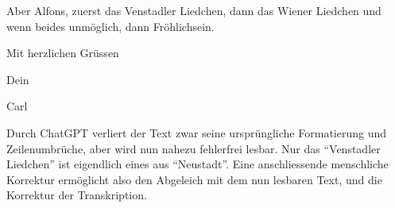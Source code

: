 \documentclass[12pt, a4paper, ngerman, bidi=default]{article}
\begin{document}
\begin{description}
\begin{tcolorbox}[colback=oldLetter, colframe=black, sharp corners, width=\textwidth]
Aber Alfons, zuerst das Venstadler Liedchen, dann das Wiener Liedchen und wenn beides unmöglich, dann Fröhlichsein.

Mit herzlichen Grüssen

Dein

Carl
\end{tcolorbox}

\label{fig:brief-carl-alfons}

Durch ChatGPT verliert der Text zwar seine ursprüngliche Formatierung und Zeilenumbrüche, aber wird nun nahezu fehlerfrei lesbar. Nur das \enquote{Venstadler Liedchen} ist eigendlich eines aus \enquote{Neustadt}. Eine anschliessende menschliche Korrektur ermöglicht also den Abgeleich mit dem nun lesbaren Text, und die Korrektur der Transkription.


\end{description}
\end{document}

